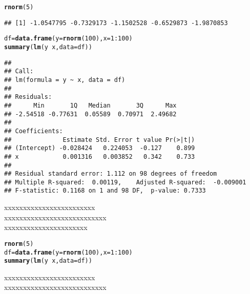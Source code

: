 \documentclass[oneside,svgnames,x11names,x11names,HTML,twoside]{libro-est}\usepackage[]{graphicx}\usepackage[]{color}
\makeatletter
\newcommand{\hlnum}[1]{\textcolor[rgb]{0.686,0.059,0.569}{#1}}%
\newcommand{\hlopt}[1]{\textcolor[rgb]{0,0,0}{#1}}%
\newcommand{\hlstd}[1]{\textcolor[rgb]{0.345,0.345,0.345}{#1}}%
\newcommand{\hlkwb}[1]{\textcolor[rgb]{0.69,0.353,0.396}{#1}}%
\newcommand{\hlkwc}[1]{\textcolor[rgb]{0.333,0.667,0.333}{#1}}%
\newcommand{\hlkwd}[1]{\textcolor[rgb]{0.737,0.353,0.396}{\textbf{#1}}}%
\newenvironment{kframe}{%
 \def\at@end@of@kframe{}%
 \ifinner\ifhmode%
  \def\at@end@of@kframe{\end{minipage}}%
  \begin{minipage}{\columnwidth}%
 \fi\fi%
 \def\FrameCommand##1{\hskip\@totalleftmargin \hskip-\fboxsep
 \colorbox{shadecolor}{##1}\hskip-\fboxsep
     \hskip-\linewidth \hskip-\@totalleftmargin \hskip\columnwidth}%
 \MakeFramed {\advance\hsize-\width
   \@totalleftmargin\z@ \linewidth\hsize
   \@setminipage}}%
 {\par\unskip\endMakeFramed%
 \at@end@of@kframe}
\newenvironment{knitrout}{}{} %
\makeatother
\begin{document}
\begin{knitrout}
\color{fgcolor}\begin{kframe}
\begin{alltt}
\hlkwd{rnorm}\hlstd{(}\hlnum{5}\hlstd{)}
\end{alltt}
\begin{verbatim}
## [1] -1.0547795 -0.7329173 -1.1502528 -0.6529873 -1.9870853
\end{verbatim}
\begin{alltt}
\hlstd{df}\hlkwb{=}\hlkwd{data.frame}\hlstd{(}\hlkwc{y}\hlstd{=}\hlkwd{rnorm}\hlstd{(}\hlnum{100}\hlstd{),} \hlkwc{x}\hlstd{=}\hlnum{1}\hlopt{:}\hlnum{100}\hlstd{)}
\hlkwd{summary}\hlstd{(}\hlkwd{lm}\hlstd{(y}\hlopt{~}\hlstd{x,} \hlkwc{data}\hlstd{=df))}
\end{alltt}
\begin{verbatim}
## 
## Call:
## lm(formula = y ~ x, data = df)
## 
## Residuals:
##      Min       1Q   Median       3Q      Max 
## -2.54518 -0.77631  0.05589  0.70971  2.49682 
## 
## Coefficients:
##              Estimate Std. Error t value Pr(>|t|)
## (Intercept) -0.028424   0.224053  -0.127    0.899
## x            0.001316   0.003852   0.342    0.733
## 
## Residual standard error: 1.112 on 98 degrees of freedom
## Multiple R-squared:  0.00119,	Adjusted R-squared:  -0.009001 
## F-statistic: 0.1168 on 1 and 98 DF,  p-value: 0.7333
\end{verbatim}
\end{kframe}
\end{knitrout}
xxxxxxxxxxxxxxxxxxxxxxxx\\
xxxxxxxxxxxxxxxxxxxxxxxxxxx\\
xxxxxxxxxxxxxxxxxxxxxx\\
\begin{knitrout}
\color{fgcolor}\begin{kframe}
\begin{alltt}
\hlkwd{rnorm}\hlstd{(}\hlnum{5}\hlstd{)}
\hlstd{df}\hlkwb{=}\hlkwd{data.frame}\hlstd{(}\hlkwc{y}\hlstd{=}\hlkwd{rnorm}\hlstd{(}\hlnum{100}\hlstd{),} \hlkwc{x}\hlstd{=}\hlnum{1}\hlopt{:}\hlnum{100}\hlstd{)}
\hlkwd{summary}\hlstd{(}\hlkwd{lm}\hlstd{(y}\hlopt{~}\hlstd{x,} \hlkwc{data}\hlstd{=df))}
\end{alltt}
\end{kframe}
\end{knitrout}
xxxxxxxxxxxxxxxxxxxxxxxx\\
xxxxxxxxxxxxxxxxxxxxxxxxxxx\\
\end{document}
